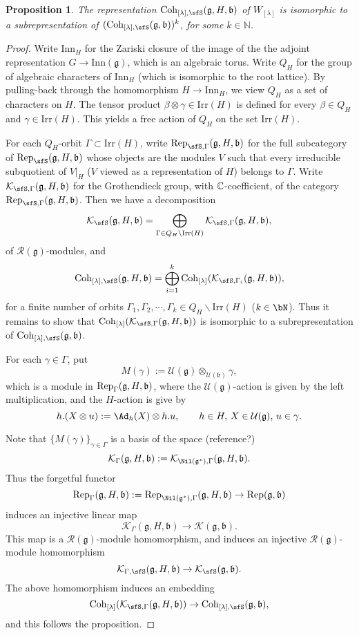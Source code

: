 \documentclass[12pt,a4paper]{amsart}
\newcommand{\BN}{{\mathbb {N}}}
\newcommand{\CK}{{\mathcal {K}}}
\newcommand{\CU}{{\mathcal {U}}}
\newcommand{\g}{\mathfrak g}
\renewcommand{\b}{\mathfrak b}
\numberwithin{equation}{section}
\newtheorem{prop}[thm]{Proposition}
\theoremstyle{remark}
\def\Irr{\mathrm{Irr}}
\def\Coh{\mathrm{Coh}}
\def\Inn{\mathrm{Inn}}
\newcommand{\Lam}{{[\lambda]}}
\begin{document}
 \begin{prop}\label{lem0022}
The representation $\Coh_{\Lam,\sfS}(\g,H,\b)$ of $W_{[\lambda]}$ is isomorphic to a subrepresentation of $(\Coh_{\Lam,\sfS}(\g,\b))^k$, for some $k\in \BN$.
     \end{prop}
\begin{proof}


Write $\Inn_H$ for the Zariski closure of the image of the  the adjoint representation $G\rightarrow \Inn(\g)$, which is an algebraic torus. Write $Q_H$ for the group of algebraic characters of $\Inn_H$ (which is isomorphic to  the root lattice). By pulling-back through the homomorphism $H\rightarrow \Inn_H$, we view $Q_H$ as a set of characters on $H$.
The tensor product $\beta\otimes \gamma\in \Irr(H)$ is defined for every $\beta\in Q_H$ and $\gamma\in \Irr(H)$. This yields a free action of $Q_H$ on the set $\Irr(H)$.

For each $Q_H$-orbit $\Gamma\subset \Irr(H)$, write $\Rep_{\sfS,\Gamma}(\g,H,\b)$ for the full subcategory of $\Rep_\sfS(\g,H,\b)$ whose objects are  the modules $V$ such that every irreducible subquotient of $V|_H$ ($V$ viewed as a representation of $H$) belongs to $\Gamma$. Write $\CK_{\sfS,\Gamma}(\g,H,\b)$ for the  Grothendieck group, with $\mathbb{C}$-coefficient, of the category $\Rep_{\sfS,\Gamma}(\g,H,\b)$.
Then  we have a decomposition
\[
\CK_\sfS(\g,H,\b)=\bigoplus_{\Gamma\in Q_H\backslash \Irr(H)} \CK_{\sfS,\Gamma}(\g,H,\b),
\]
of $\mathcal R(\g)$-modules, and
\[
\Coh_{\Lam,\sfS}(\g,H,\b)=\bigoplus_{i=1}^k  \Coh_{\Lam}(\CK_{ \sfS,\Gamma_i}(\g,H,\b)),
\]
for a finite number of orbits $\Gamma_1, \Gamma_2, \cdots, \Gamma_k\in Q_H\backslash \Irr(H)$ ($k\in \bN$). Thus it remains to show that $ \Coh_{\Lam}(\CK_{ \sfS,\Gamma}(\g,H,\b))$ is isomorphic to a subrepresentation of  $\Coh_{\Lam,\sfS}(\g,\b)$.



For each $\gamma\in \Gamma$, put
\[
  M(\gamma):=\CU(\g)\otimes_{\CU(\b)} \gamma,
\]
which is a module in $\Rep_\Gamma(\g,H,\b)$, where the $\CU(\g)$-action is given by the left multiplication, and the $H$-action is give by
\[
 h.(X\otimes u):=\Ad_h(X)\otimes h.u, \qquad h\in H, \, X\in \CU(\g),\, u\in \gamma.
\]

Note that $\{ M(\gamma)\}_{\gamma\in \Gamma}$ is a basis of the space (reference?)
\[
\CK_{\Gamma}(\g,H,\b):=\CK_{\Nil(\g^*),\Gamma}(\g,H,\b).
\]
Thus the forgetful functor
\[
   \Rep_{\Gamma}(\g,H,\b):=\Rep_{\Nil(\g^*),\Gamma}(\g,H,\b)\rightarrow  \Rep(\g,\b)
\]
induces an injective linear map
\[
    \CK_{\Gamma}(\g,H,\b)\rightarrow  \CK(\g,\b).
\]
This map is a $\mathcal R(\g)$-module homomorphism, and induces an injective
$\mathcal R(\g)$-module homomorphism
\[
    \CK_{\Gamma,\sfS}(\g,H,\b)\rightarrow  \CK_\sfS(\g,\b).
\]
The above homomorphism induces an embedding
\[
    \Coh_{\Lam}(\CK_{ \sfS,\Gamma}(\g,H,\b))\rightarrow  \Coh_{\Lam,\sfS}(\g,\b),
\]
and this follows the proposition.

\end{proof}
\end{document}
